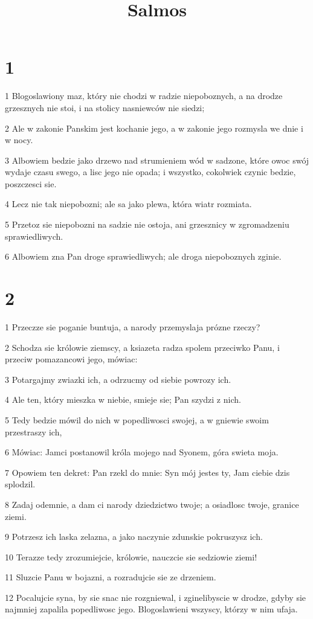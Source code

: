 

\title{Salmos}


\chapter{1}

\par 1 Blogoslawiony maz, który nie chodzi w radzie niepoboznych, a na drodze grzesznych nie stoi, i na stolicy nasniewców nie siedzi;
\par 2 Ale w zakonie Panskim jest kochanie jego, a w zakonie jego rozmysla we dnie i w nocy.
\par 3 Albowiem bedzie jako drzewo nad strumieniem wód w sadzone, które owoc swój wydaje czasu swego, a lisc jego nie opada; i wszystko, cokolwiek czynic bedzie, poszczesci sie.
\par 4 Lecz nie tak niepobozni; ale sa jako plewa, która wiatr rozmiata.
\par 5 Przetoz sie niepobozni na sadzie nie ostoja, ani grzesznicy w zgromadzeniu sprawiedliwych.
\par 6 Albowiem zna Pan droge sprawiedliwych; ale droga niepoboznych zginie.

\chapter{2}

\par 1 Przeczze sie poganie buntuja, a narody przemyslaja prózne rzeczy?
\par 2 Schodza sie królowie ziemscy, a ksiazeta radza spolem przeciwko Panu, i przeciw pomazancowi jego, mówiac:
\par 3 Potargajmy zwiazki ich, a odrzucmy od siebie powrozy ich.
\par 4 Ale ten, który mieszka w niebie, smieje sie; Pan szydzi z nich.
\par 5 Tedy bedzie mówil do nich w popedliwosci swojej, a w gniewie swoim przestraszy ich,
\par 6 Mówiac: Jamci postanowil króla mojego nad Syonem, góra swieta moja.
\par 7 Opowiem ten dekret: Pan rzekl do mnie: Syn mój jestes ty, Jam ciebie dzis splodzil.
\par 8 Zadaj odemnie, a dam ci narody dziedzictwo twoje; a osiadlosc twoje, granice ziemi.
\par 9 Potrzesz ich laska zelazna, a jako naczynie zdunskie pokruszysz ich.
\par 10 Terazze tedy zrozumiejcie, królowie, nauczcie sie sedziowie ziemi!
\par 11 Sluzcie Panu w bojazni, a rozradujcie sie ze drzeniem.
\par 12 Pocalujcie syna, by sie snac nie rozgniewal, i zginelibyscie w drodze, gdyby sie najmniej zapalila popedliwosc jego. Blogoslawieni wszyscy, którzy w nim ufaja.

